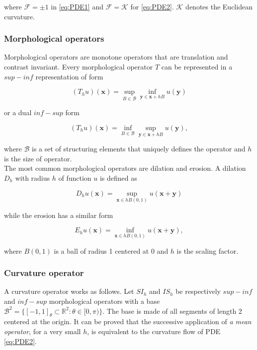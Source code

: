 where $\mathcal{F} = \pm 1$ in \ref{eq:PDE1} and $\mathcal{F} = \mathcal{K}$ for \ref{eq:PDE2}. $\mathcal{K}$ denotes the Euclidean curvature.



\subsubsection{Morphological operators} 

Morphological operators are monotone operators that are translation and contrast invariant. Every morphological operator $T$ can be represented in a $sup-inf$ representation of form 

\begin{equation}
	(T_hu)(\mathbf{x}) = \sup_{B \in \mathcal{B}} \inf_{\mathbf{y} \in \mathbf{x} + hB}u(\mathbf{y})
\end{equation}

or a dual $inf-sup$ form

\begin{equation}
	(T_hu)(\mathbf{x}) = \inf_{B \in \mathcal{B}} \sup_{\mathbf{y} \in \mathbf{x} + hB}u(\mathbf{y}),
\end{equation}

where $\mathcal{B}$ is a set of structuring elements that uniquely defines the operator and $h$ is the size of operator. \\

The most common morphological operators are dilation and erosion. A dilation $D_h$ with radius $h$ of function $u$ is defined as 

\begin{equation}
	D_hu(\mathbf{x}) = \sup_{\mathbf{x} \in hB(0,1)} u(\mathbf{x} + \mathbf{y})
\end{equation}

while the erosion has a similar form

\begin{equation}
	E_hu(\mathbf{x}) = \inf_{\mathbf{x} \in hB(0,1)} u(\mathbf{x} + \mathbf{y}),
\end{equation}

 where $B(0,1)$ is a ball of radius 1 centered at 0 and $h$ is the scaling factor.
 
\subsubsection{Curvature operator}

A curvature operator works as follows. Let $SI_h$ and $IS_h$ be respectively $sup-inf$ and $inf-sup$ morphological operators with a base $\mathcal{B}^2 = \{ [-1,1]_{\theta} \subset \mathbb{R}^2 : \theta \in [0, \pi) \}$. The base is made of all segments of length 2 centered at the origin. It can be proved that the successive application of \textit{a mean operator}, for a very small $h$, is equivalent to the curvature flow of PDE \ref{eq:PDE2}. \\

